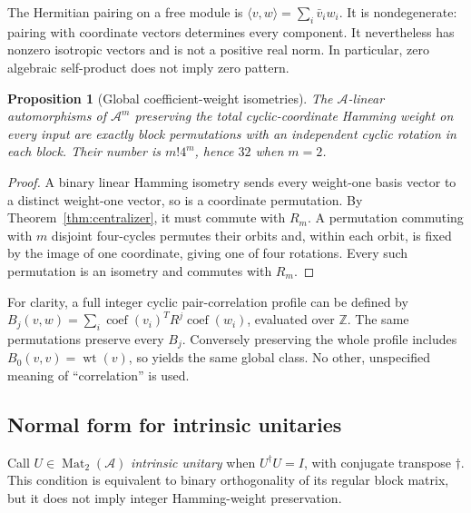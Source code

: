 \documentclass[11pt,a4paper]{article}
\newtheorem{proposition}[theorem]{Proposition}
\theoremstyle{definition}\newtheorem{definition}[theorem]{Definition}
\theoremstyle{remark}\newtheorem{remark}[theorem]{Remark}
\newcommand{\A}{\mathcal A}
\newcommand{\wt}{\operatorname{wt}}
\newcommand{\Mat}{\operatorname{Mat}}
\numberwithin{equation}{section}
\begin{document}
The Hermitian pairing on a free module is
$\langle v,w\rangle=\sum_i\bar v_iw_i$. It is nondegenerate: pairing with coordinate vectors determines every component. It nevertheless has nonzero isotropic vectors and is not a positive real norm. In particular, zero algebraic self-product does not imply zero pattern.

\begin{proposition}[Global coefficient-weight isometries]\label{prop:hamming}
The $\A$-linear automorphisms of $\A^m$ preserving the total cyclic-coordinate Hamming weight on every input are exactly block permutations with an independent cyclic rotation in each block. Their number is $m!4^m$, hence $32$ when $m=2$.
\end{proposition}
\begin{proof}
A binary linear Hamming isometry sends every weight-one basis vector to a distinct weight-one vector, so is a coordinate permutation. By Theorem~\ref{thm:centralizer}, it must commute with $R_m$. A permutation commuting with $m$ disjoint four-cycles permutes their orbits and, within each orbit, is fixed by the image of one coordinate, giving one of four rotations. Every such permutation is an isometry and commutes with $R_m$.
\end{proof}
For clarity, a full integer cyclic pair-correlation profile can be defined by
$B_j(v,w)=\sum_i \operatorname{coef}(v_i)^T R^j\operatorname{coef}(w_i)$, evaluated over $\mathbb Z$. The same permutations preserve every $B_j$. Conversely preserving the whole profile includes $B_0(v,v)=\wt(v)$, so yields the same global class. No other, unspecified meaning of ``correlation'' is used.

\subsection{Normal form for intrinsic unitaries}
Call $U\in\Mat_2(\A)$ \emph{intrinsic unitary} when $U^\dagger U=I$, with conjugate transpose $\dagger$. This condition is equivalent to binary orthogonality of its regular block matrix, but it does not imply integer Hamming-weight preservation.
\end{document}
